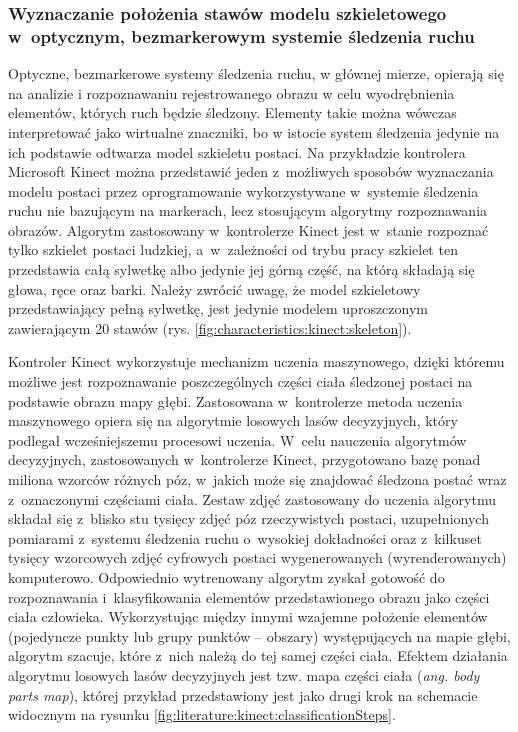 \subsubsection*{Wyznaczanie położenia stawów modelu szkieletowego w~optycznym, bezmarkerowym systemie śledzenia ruchu}\label{chap:humanModel:kinect}
Optyczne, bezmarkerowe systemy śledzenia ruchu, w głównej mierze, opierają się na analizie i rozpoznawaniu rejestrowanego obrazu w celu wyodrębnienia elementów, których ruch będzie śledzony. Elementy takie można wówczas interpretować jako wirtualne znaczniki, bo w istocie system śledzenia jedynie na ich podstawie odtwarza model szkieletu postaci. Na przykładzie kontrolera Microsoft Kinect można przedstawić jeden z~możliwych sposobów wyznaczania modelu postaci przez oprogramowanie wykorzystywane w~systemie śledzenia ruchu nie bazującym na markerach, lecz stosującym algorytmy rozpoznawania obrazów. Algorytm zastosowany w~kontrolerze Kinect jest w~stanie rozpoznać tylko szkielet postaci ludzkiej, a~w~zależności od trybu pracy szkielet ten przedstawia całą sylwetkę albo jedynie jej górną część, na którą składają się głowa, ręce oraz barki. Należy zwrócić uwagę, że model szkieletowy przedstawiający pełną sylwetkę, jest jedynie modelem uproszczonym zawierającym 20 stawów (rys. \ref{fig:characteristics:kinect:skeleton}).
																							
Kontroler Kinect wykorzystuje mechanizm uczenia maszynowego, dzięki któremu możliwe jest rozpoznawanie poszczególnych części ciała śledzonej postaci na podstawie obrazu mapy głębi. Zastosowana w~kontrolerze metoda uczenia maszynowego opiera się na algorytmie losowych lasów decyzyjnych\cite{Criminisi2011}, który podlegał wcześniejszemu procesowi uczenia. W~celu nauczenia algorytmów decyzyjnych, zastosowanych w~kontrolerze Kinect, przygotowano bazę ponad miliona wzorców różnych póz, w~jakich może się znajdować śledzona postać wraz z~oznaczonymi częściami ciała. Zestaw zdjęć zastosowany do uczenia algorytmu składał się z~blisko stu tysięcy zdjęć póz rzeczywistych postaci, uzupełnionych pomiarami z~systemu śledzenia ruchu o~wysokiej dokładności oraz z~kilkuset tysięcy wzorcowych zdjęć cyfrowych postaci wygenerowanych (wyrenderowanych) komputerowo\cite{MacCormick2011}. Odpowiednio wytrenowany algorytm zyskał gotowość do rozpoznawania i~klasyfikowania elementów przedstawionego obrazu jako części ciała człowieka. Wykorzystując między innymi wzajemne położenie elementów (pojedyncze punkty lub grupy punktów -- obszary) występujących na mapie głębi, algorytm szacuje, które z~nich należą do tej samej części ciała. Efektem działania algorytmu losowych lasów decyzyjnych jest tzw. mapa części ciała (\emph{ang. body parts map}), której przykład przedstawiony jest jako drugi krok na schemacie widocznym na rysunku \ref{fig:literature:kinect:classificationSteps}.
																							
